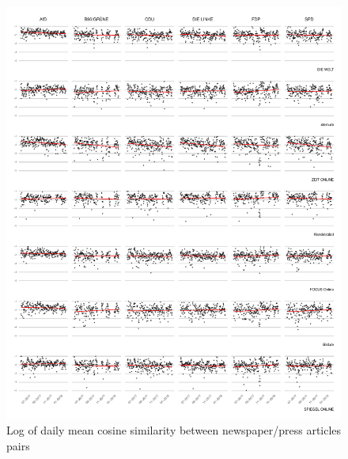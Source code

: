 \documentclass[
]{article}
\begin{document}
\begin{figure}

{\centering \includegraphics[width=0.8\linewidth]{main_text_files/figure-latex/Daily mean cosine similarity-1} 

}

\caption{Log of daily mean cosine similarity between newspaper/press articles pairs \label{fig:mean_cosine_sim_ols}}\label{fig:Daily mean cosine similarity}
\end{figure}
\end{document}
